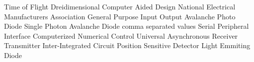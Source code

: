 
	{Time of Flight}
	{Dreidimensional}
	{Computer Aided Design}
	{National Electrical Manufacturers Association}
	{General Purpose Input Output}
	{Avalanche Photo Diode}
	{Single Photon Avalanche Diode}
	{comma separated values}
	{Serial Peripheral Interface}
	{Computerized Numerical Control}	
	{Universal Asynchronous Receiver Transmitter}
	{Inter-Integrated Circuit}
	{Position Sensitive Detector}
	{Light Emmiting Diode}